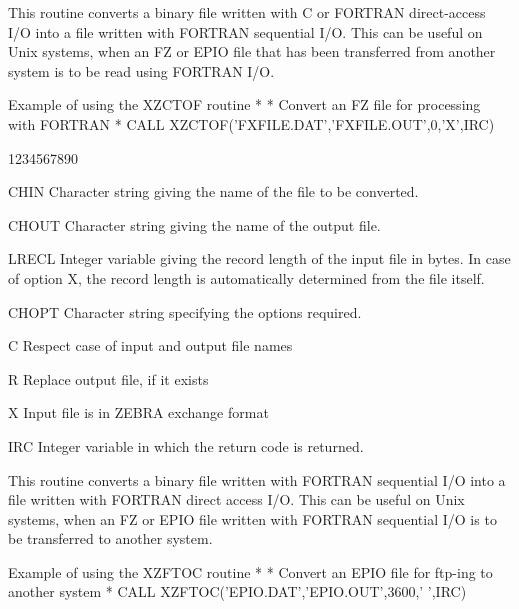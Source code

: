 This routine converts a binary file written with C or FORTRAN
direct-access I/O into a file written with FORTRAN sequential
I/O. This can be useful on Unix systems, when an FZ or EPIO
file that has been transferred from another system is to be read using
FORTRAN I/O.
\begin{XMPt}{Example of using the XZCTOF routine}
*
*     Convert an FZ file for processing with FORTRAN
*
      CALL XZCTOF('FXFILE.DAT','FXFILE.OUT',0,'X',IRC)
\end{XMPt}
\begin{DLtt}{1234567890}
\item[CHIN]Character string giving the name of the file
to be converted.
\item[CHOUT]Character string giving the name of the output
file.
\item[LRECL]Integer variable giving the record length of the
input file in bytes. In case of option X, the record length
is automatically determined from the file itself.
\item[CHOPT]Character string specifying the options required.
\begin{DLtt}{12}
\item[C]Respect case of input and output file names
\item[R]Replace output file, if it exists
\item[X]Input file is in ZEBRA exchange format
\end{DLtt}
\item[IRC]Integer variable in which the return code is returned.
\end{DLtt}
This routine converts a binary file written with FORTRAN
sequential I/O into a file written with FORTRAN direct access
I/O. This can be useful on Unix systems, when an FZ or EPIO
file written with FORTRAN sequential I/O is to be transferred
to another system.
\begin{XMPt}{Example of using the XZFTOC routine}
*
*     Convert an EPIO file for ftp-ing to another system
*
      CALL XZFTOC('EPIO.DAT','EPIO.OUT',3600,' ',IRC)
\end{XMPt}

